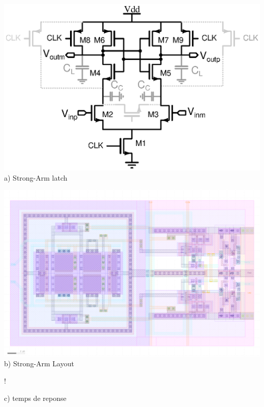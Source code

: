 \begin{mdframed}[linecolor=Prune,linewidth=1]
    \begin{center}
        \centering
        \begin{minipage}[b]{0.33\textwidth}
            \centering
            \includegraphics[width=\textwidth]{Abstract/Figs/sa_designed.eps}
            a) Strong-Arm latch
        \end{minipage}
        \begin{minipage}[b]{0.33\textwidth}
            \centering
            \includegraphics[width=\textwidth]{Chapter7/Figs/layout-slow-sa.png}
            b) Strong-Arm Layout
        \end{minipage}
        \begin{minipage}[b]{0.33\textwidth}
            \centering
            \resizebox {\textwidth} {!} { 
                
            }
            c) temps de reponse
        \end{minipage}
        \begin{minipage}[b]{0.33\textwidth}

\end{minipage}
\end{center}
\end{mdframed}
